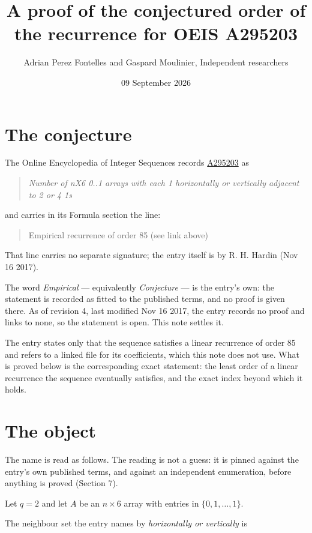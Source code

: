 \documentclass[11pt]{article}
\title{A proof of the conjectured order of the recurrence for OEIS A295203}
\author{Adrian Perez Fontelles and Gaspard Moulinier, Independent researchers}
\date{09 September 2026}
\theoremstyle{definition}
\begin{document}
\maketitle
\section{The conjecture}

The Online Encyclopedia of Integer Sequences records \href{https://oeis.org/A295203}{A295203} as

\begin{quote}\itshape Number of nX6 0..1 arrays with each 1 horizontally or vertically adjacent to 2 or 4 1s\end{quote}

and carries in its Formula section the line:

\begin{quote}\ttfamily Empirical recurrence of order 85 (see link above)\end{quote}

That line carries no separate signature; the entry itself is by R. H. Hardin (Nov 16 2017).

The word {\itshape Empirical} --- equivalently {\itshape Conjecture} --- is the entry's own: the statement is recorded as fitted to the published terms, and no proof is given there. As of revision 4, last modified Nov 16 2017, the entry records no proof and links to none, so the statement is open. This note settles it.

The entry states only that the sequence satisfies a linear recurrence of order $85$ and refers to a linked file for its coefficients, which this note does not use. What is proved below is the corresponding exact statement: the least order of a linear recurrence the sequence eventually satisfies, and the exact index beyond which it holds.

\section{The object}

The name is read as follows. The reading is not a guess: it is pinned against the entry's own published terms, and against an independent enumeration, before anything is proved (Section 7).

Let $q = 2$ and let $A$ be an $n \times 6$ array with entries in $\{0,1,\dots,1\}$.

The neighbour set the entry names by {\itshape horizontally or vertically} is
\end{document}
